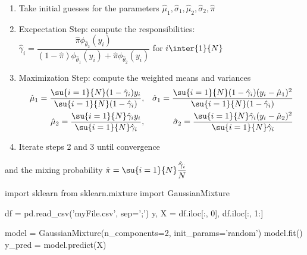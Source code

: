 \begin{enumerate}
	\item  Take initial guesses for the parameters $\hat{\mu}_{1}, \hat{\sigma}_{1}, \hat{\mu}_{2}, \hat{\sigma}_{2}, \hat{\pi}$
	\item Excpectation Step: compute the responsibilities: 
		$\hat{\gamma}_{i}=\dfrac{\hat{\pi}\phi_{\hat{\theta}_{2}}(y_{i})}{(1-\hat{\pi})\phi_{\hat{\theta}_{1}}(y_{i}) + \hat{\pi}\phi_{\hat{\theta}_{2}}(y_{i})}$ for $i\inter{1}{N}$
	\item Maximization Step: compute the weighted means and variances
		\begin{align*}
			\hat{\mu}_{1} = \dfrac{\su{{i=1}}{N}(1-\hat{\gamma}_{i})y_{i}}{\su{{i=1}}{N}(1-\hat{\gamma}_{i})}&, & 
			\hat{\sigma}_{1} = \dfrac{\su{{i=1}}{N}(1-\hat{\gamma}_{i})(y_{i}-\hat{\mu}_{1})^{2}}{\su{{i=1}}{N}(1-\hat{\gamma}_{i})}\\
			\hat{\mu}_{2} = \dfrac{\su{{i=1}}{N}\hat{\gamma}_{i}y_{i}}{\su{{i=1}}{N}\hat{\gamma}_{i}}&, & 
			\hat{\sigma}_{2} = \dfrac{\su{{i=1}}{N}\hat{\gamma}_{i}(y_{i}-\hat{\mu}_{2})^{2}}{\su{{i=1}}{N}\hat{\gamma}_{i}}
		\end{align*}
	\item Iterate steps 2 and 3 until convergence
\end{enumerate}
and the mixing probability $\hat{\pi}=\su{{i=1}}{N}\dfrac{\hat{\gamma}_{i}}{N}$

\begin{python}
import sklearn
from sklearn.mixture import GaussianMixture

df = pd.read_csv('myFile.csv', sep=';')
y, X = df.iloc[:, 0], df.iloc[:, 1:]

model = GaussianMixture(n_components=2,
    init_params='random')
model.fit()
y_pred = model.predict(X)
\end{python}

